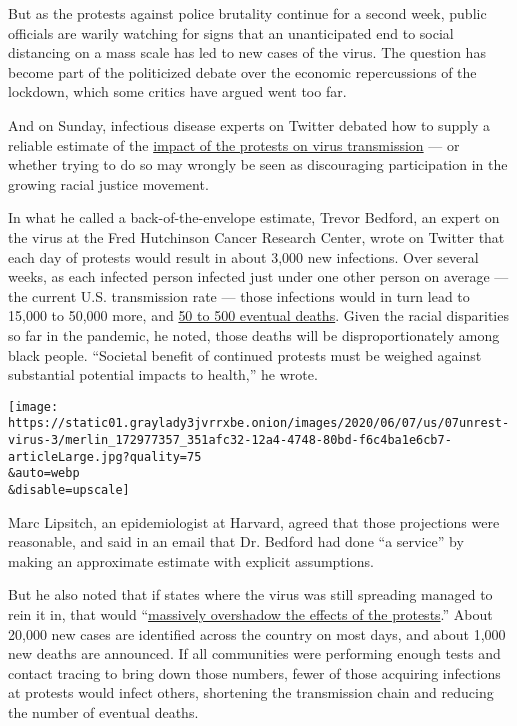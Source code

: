 But as the protests against police brutality continue for a second week,
public officials are warily watching for signs that an unanticipated end
to social distancing on a mass scale has led to new cases of the virus.
The question has become part of the politicized debate over the economic
repercussions of the lockdown, which some critics have argued went too
far.

And on Sunday, infectious disease experts on Twitter debated how to
supply a reliable estimate of the
\href{https://www.nytimes3xbfgragh.onion/2020/07/01/nyregion/nyc-coronavirus-protests.html}{impact
of the protests on virus transmission} --- or whether trying to do so
may wrongly be seen as discouraging participation in the growing racial
justice movement.

In what he called a back-of-the-envelope estimate, Trevor Bedford, an
expert on the virus at the Fred Hutchinson Cancer Research Center, wrote
on Twitter that each day of protests would result in about 3,000 new
infections. Over several weeks, as each infected person infected just
under one other person on average --- the current U.S. transmission rate
--- those infections would in turn lead to 15,000 to 50,000 more, and
\href{https://twitter.com/trvrb/status/1269786156616433664}{50 to 500
eventual deaths}. Given the racial disparities so far in the pandemic,
he noted, those deaths will be disproportionately among black people.
``Societal benefit of continued protests must be weighed against
substantial potential impacts to health,'' he wrote.

\texttt{[image: https://static01.graylady3jvrrxbe.onion/images/2020/06/07/us/07unrest-virus-3/merlin\_172977357\_351afc32-12a4-4748-80bd-f6c4ba1e6cb7-articleLarge.jpg?quality=75\\\&auto=webp\\\&disable=upscale]}

Marc Lipsitch, an epidemiologist at Harvard, agreed that those
projections were reasonable, and said in an email that Dr. Bedford had
done ``a service'' by making an approximate estimate with explicit
assumptions.

But he also noted that if states where the virus was still spreading
managed to rein it in, that would
``\href{https://twitter.com/mlipsitch/status/1269668219196932098}{massively
overshadow the effects of the protests}.'' About 20,000 new cases are
identified across the country on most days, and about 1,000 new deaths
are announced. If all communities were performing enough tests and
contact tracing to bring down those numbers, fewer of those acquiring
infections at protests would infect others, shortening the transmission
chain and reducing the number of eventual deaths.

